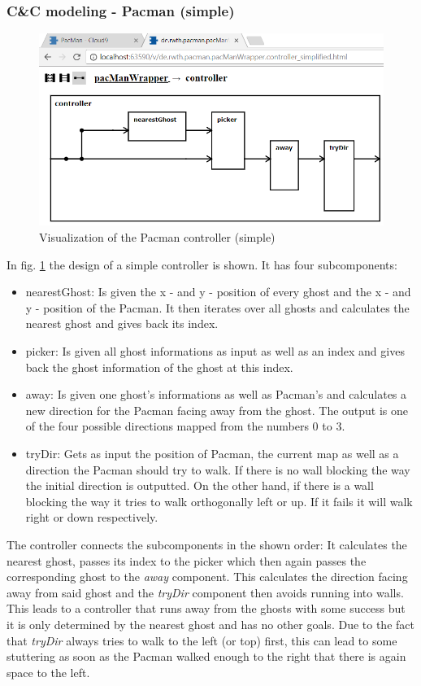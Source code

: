 \subsubsection{C\&C modeling - Pacman (simple)}
\begin{figure}
	\caption{Visualization of the Pacman controller (simple)}
	\label{fig:visPacmanSimple}
	\centering
	\includegraphics[scale=0.7]{pictures/VisualizationPacmanSimple.png}
\end{figure}
In fig. \ref{fig:visPacmanSimple} the design of a simple controller is shown. It has four subcomponents:
\begin{itemize}
	\item nearestGhost: Is given the x - and y - position of every ghost and the x - and y - position of the Pacman. It then iterates over all ghosts and calculates the nearest ghost and gives back its index.
	\item picker: Is given all ghost informations as input as well as an index and gives back the ghost information of the ghost at this index.
	\item away: Is given one ghost's informations as well as Pacman's and calculates a new direction for the Pacman facing away from the ghost. The output is one of the four possible directions mapped from the numbers 0 to 3.
	\item tryDir: Gets as input the position of Pacman, the current map as well as a direction the Pacman should try to walk. If there is no wall blocking the way the initial direction is outputted. On the other hand, if there is a wall blocking the way it tries to walk orthogonally left or up. If it fails it will walk right or down respectively.
\end{itemize}
The controller connects the subcomponents in the shown order: It calculates the nearest ghost, passes its index to the picker which then again passes the corresponding ghost to the \textit{away} component. This calculates the direction facing away from said ghost and the \textit{tryDir} component then avoids running into walls. This leads to a controller that runs away from the ghosts with some success but it is only determined by the nearest ghost and has no other goals. Due to the fact that \textit{tryDir} always tries to walk to the left (or top) first, this can lead to some stuttering as soon as the Pacman walked enough to the right that there is again space to the left. \newline

